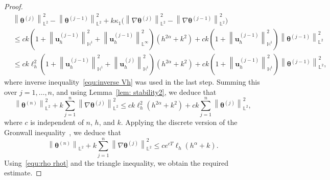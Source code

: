 \documentclass[11pt,reqno]{amsart}
\theoremstyle{definition}
\numberwithin{equation}{section}
\newcommand{\bff}{\boldsymbol}
\newcommand{\bb}{\mathbb}
\newcommand{\norm}[2]{\left\|{#1}\right\|_{#2}}
\begin{document}
\begin{proof}
\begin{align*}
	&\norm{\bff{\theta}^{(j)}}{\bb{L}^2}^2 
	- 
	\norm{\bff{\theta}^{(j-1)}}{\bb{L}^2}^2
	+
	k\kappa_1 \Big(\norm{\nabla\bff{\theta}^{(j)}}{\bb{L}^2}^2 
	- 
	\norm{\nabla\bff{\theta}^{(j-1)}}{\bb{L}^2}^2 \Big)
	\\
	&\leq
	ck \left(1+\norm{\bff{u}_h^{(j-1)}}{\bb{H}^1}^2 +\norm{\bff{u}_h^{(j-1)}}{\bb{L}^\infty}^2 \right) \left(h^{2\alpha}+ k^2 \right) 
	+
	ck \left(1+\norm{\bff{u}_h^{(j-1)}}{\bb{H}^1}^2 \right) \norm{\bff{\theta}^{(j-1)}}{\bb{L}^2}^2
	\\
	&\leq
	ck\ell_h^2 \left(1+\norm{\bff{u}_h^{(j-1)}}{\bb{H}^1}^2 +\norm{\bff{u}_h^{(j)}}{\bb{H}^1}^2 \right) \left(h^{2\alpha}+ k^2 \right) 
	+
	ck \left(1+\norm{\bff{u}_h^{(j-1)}}{\bb{H}^1}^2 \right) \norm{\bff{\theta}^{(j-1)}}{\bb{L}^2}^2,
\end{align*}
where inverse inequality~\eqref{equ:inverse Vh} was used in the last step.
Summing this over $j=1,\ldots, n$, and using Lemma~\ref{lem: stability2}, we deduce that
\[
	\norm{\bff{\theta}^{(n)}}{\bb{L}^2}^2
	+
	k \sum_{j=1}^n \norm{\nabla \bff{\theta}^{(j)}}{\bb{L}^2}^2
	\le
	ck \ell_h^2 (h^{2\alpha}+k^2) + ck \sum_{j=1}^n \norm{\bff{\theta}^{(j)}}{\bb{L}^2}^2,
\]
where $c$ is independent of $n$, $h$, and $k$.
Applying the discrete version of the Gronwall inequality~\citep[Lemma~1]{Sug69}, we
deduce that
\begin{equation*}
	\norm{\bff{\theta}^{(n)}}{\bb{L}^2} + k \sum_{j=1}^n \norm{\nabla \bff{\theta}^{(j)}}{\bb{L}^2}^2 
	\leq ce^{cT}\ell_h (h^{\alpha}+k).
\end{equation*}
Using~\eqref{equ:rho rhot}
and the triangle inequality, we obtain the required estimate.
\end{proof}
\end{document}
